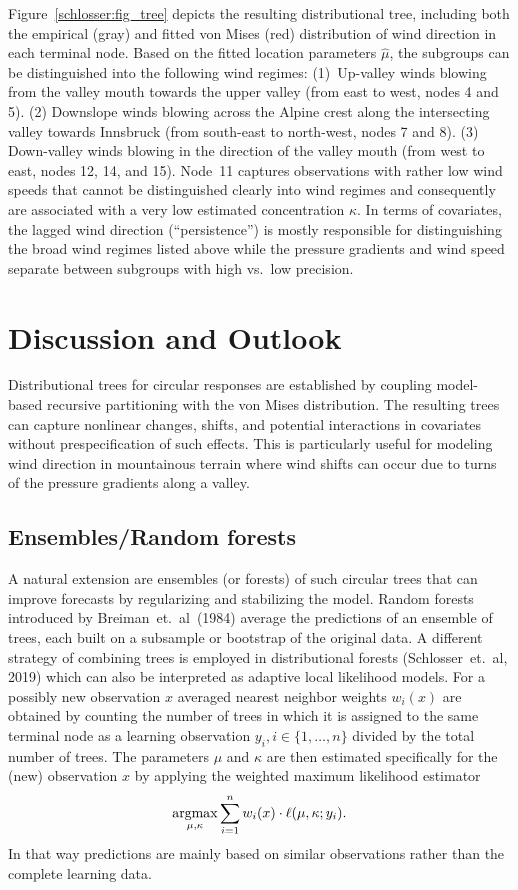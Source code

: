\documentclass[twoside]{report}
\begin{document}
Figure~\ref{schlosser:fig_tree} depicts the resulting distributional tree, including
both the empirical (gray) and fitted von Mises (red) distribution of wind direction
in each terminal node. Based on the fitted location parameters $\hat \mu$, the subgroups
can be distinguished into the following wind regimes:
(1)~Up-valley winds blowing from the valley mouth towards the upper valley
(from east to west, nodes 4 and 5). (2) Downslope winds blowing across
the Alpine crest along the intersecting valley towards Innsbruck (from south-east to
north-west, nodes 7 and 8). (3) Down-valley winds blowing in the direction
of the valley mouth (from west to east, nodes 12, 14, and 15). Node~11
captures observations with rather low wind speeds that cannot be distinguished
clearly into wind regimes and consequently are associated with a very low
estimated concentration $\hat \kappa$. In terms of covariates, the lagged
wind direction (``persistence'') is mostly responsible for distinguishing
the broad wind regimes listed above while the pressure gradients and wind
speed separate between subgroups with high vs.\ low precision.

\section{Discussion and Outlook}

Distributional trees for circular responses are established by coupling
model-based recursive partitioning with the von Mises distribution.
The resulting trees can capture nonlinear changes, shifts, and potential interactions
in covariates without prespecification of such effects. This is particularly
useful for modeling wind direction in mountainous terrain where wind shifts
can occur due to turns of the pressure gradients along a valley.

\subsection{Ensembles/Random forests}
A natural extension are ensembles (or forests) of such circular trees
that can improve forecasts by regularizing and stabilizing the model.
Random forests introduced by Breiman~et.~al~(1984) average the
predictions of an ensemble of trees, each built on a subsample 
or bootstrap of the original data. 
A different strategy of combining trees is employed in distributional forests 
(Schlosser~et.~al, 2019) which can also be interpreted as adaptive local likelihood models. 
For a possibly new observation $x$ averaged nearest neighbor weights $w_i(x)$ are obtained 
by counting the number of trees in which it is assigned to the same terminal node as a 
learning observation $y_i, i \in \{1,\ldots,n\}$ divided by the total number of trees.
The parameters $\mu$ and $\kappa$ are then estimated specifically for the (new) 
observation $x$ by applying the weighted maximum likelihood estimator
\begin{equation}
\operatorname{argmax}\displaylimits_{\mu, \kappa} \sum_{i=1}^n w_i(x) \cdot \ell(\mu, \kappa; y_i). 
\end{equation}
In that way predictions are mainly based on similar observations rather than the 
complete learning data.
\end{document}
